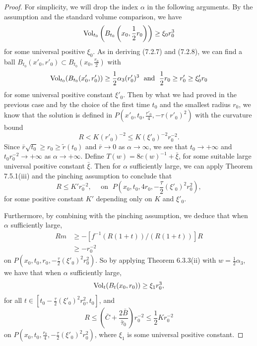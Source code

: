 \begin{proof}
For simplicity, we will drop the index $\alpha$ in the following
arguments. By the assumption and the standard volume comparison,
we have
$$
\operatorname{Vol}_{t_0}\left(B_{t_0}\left(x_0,\frac{1}{2}r_0\right)\right)\geq \xi_0r^3_0
$$
for some universal positive $\xi_0$. As in deriving (7.2.7) and
(7.2.8), we can find a ball $B_{t_0}(x'_0,r'_0)\subset
B_{t_0}(x_0,\frac{r_0}{2})$ with
$$
\operatorname{Vol}_{t_0}(B_{t_0}(x'_0,r'_0)) \geq \frac{1}{2}\alpha_3(r'_0)^3\;
\mbox{ and }\; \frac{1}{2}r_0\geq r'_0\geq \xi'_0r_0
$$
for some universal positive constant $\xi'_0$. Then by what we had
proved in the previous case and by the choice of the first time
$t_0$ and the smallest radius $r_0$, we know that the solution is
defined in $P(x'_0,t_0,\frac{r'_0}{4},-\tau (r'_0)^2)$ with the
curvature bound $$R<K(r'_0)^{-2}\leq K(\xi'_0)^{-2}r^{-2}_0.$$
Since $\bar{r}\sqrt{t_0}\geq r_0\geq \widetilde{r}(t_0)$ and
$\bar{r}\rightarrow 0$ as $\alpha\rightarrow\infty$, we see that
$t_0\rightarrow +\infty$ and $t_0r^{-2}_0\rightarrow+\infty$ as
$\alpha\rightarrow+\infty$. Define $T(w) = 8c(w)^{-1} +
\bar{\xi}$, for some suitable large universal positive constant
$\bar{\xi}$. Then for $\alpha$ sufficiently large, we can apply
Theorem 7.5.1(iii) and the pinching assumption to conclude that
\begin{equation} R\leq K'r^{-2}_0,\quad \mbox{ on }\;
P\left(x_0,t_0,4r_0,-\frac{\tau}{2}(\xi'_0)^2r^2_0\right), %
\end{equation} for some positive constant $K'$ depending only on $K$ and
$\xi'_0$.

Furthermore, by combining with the pinching assumption, we deduce
that when $\alpha$ sufficiently large,
\begin{align}
Rm &  \geq -[f^{-1}(R(1+t))/(R(1+t))]R\\
&  \geq -r^{-2}_0 \nonumber
\end{align}  %
on $P(x_0,t_0,r_0,-\frac{\tau}{2}(\xi'_0)^2r^2_0)$.  So by
applying Theorem 6.3.3(ii) with $w=\frac{1}{2}\alpha_3$, we have
that when $\alpha$ sufficiently large, \begin{equation}
\Vol_t(B_t(x_0,r_0)) \geq \xi_1 r^3_0,  %
\end{equation} for all $ t \in [t_0 -\frac{\tau}{2}(\xi'_0)^2r^2_0, t_0]$,
and \begin{equation} R\leq\left(\bar{C}+\frac{2\bar{B}}{\bar{\tau}_0}\right)r^{-2}_0\leq
\frac{1}{2}Kr^{-2}_0 %
\end{equation} on $P(x_0,t_0,\frac{r_0}{4},-\frac{\tau}{2}(\xi'_0)^2r^2_0)$,
where $\xi_1$ is some universal positive constant.


\end{proof}
